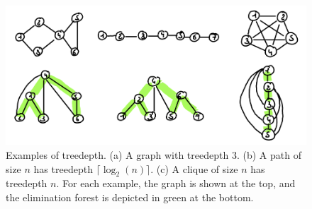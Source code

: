 \begin{figure}
    \includegraphics[width=\textwidth]{figures/treedepth-example.png}
    \caption{Examples of treedepth. (a) A graph with treedepth 3. (b) A path of size $n$ has treedepth $\lceil\log_2(n)\rceil$. (c) A clique of size $n$ has treedepth $n$. For each example, the graph is shown at the top, and the elimination forest is depicted in green at the bottom.}
    \label{fig:treedepth-example}
\end{figure}